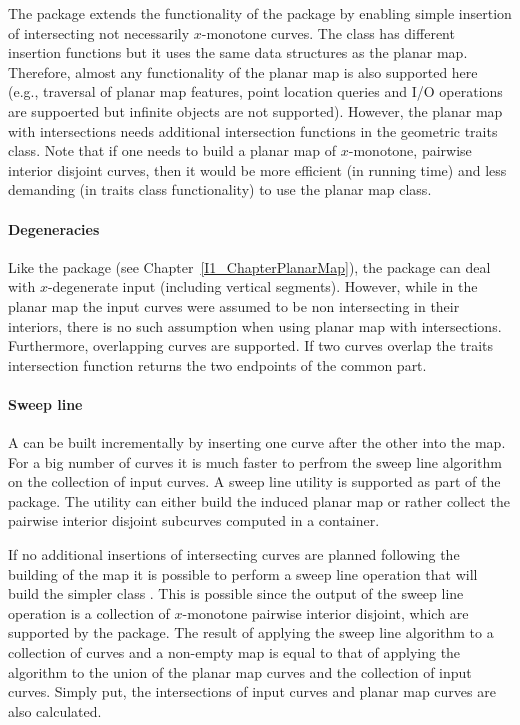   The  package extends the
  functionality of the  package by enabling simple
  insertion of intersecting not necessarily $x$-monotone curves. The
   class has different insertion
  functions but it uses the same data structures as the planar
  map. Therefore, almost any functionality of the planar map is also
  supported here (e.g., traversal of planar map features, point
  location queries and I/O operations are suppoerted but infinite
  objects are not supported). However, the planar map with
  intersections needs additional intersection functions in the
  geometric traits class. Note that if one needs to build a planar map
  of $x$-monotone, pairwise interior disjoint curves, then it would be
  more efficient (in running time) and less demanding (in traits class
  functionality) to use the planar map class.

\paragraph{Degeneracies} 
  Like the  package (see
  Chapter~\ref{I1_ChapterPlanarMap}), the  package can deal with $x$-degenerate input (including
  vertical segments). However, while in the planar map the input
  curves were assumed to be non intersecting in their interiors, there
  is no such assumption when using planar map with
  intersections. Furthermore, overlapping curves are supported. If two
  curves overlap the traits intersection function returns the two
  endpoints of the common part.

\paragraph{Sweep line}
  A  can be built incrementally by
  inserting one curve after the other into the map. For a big number
  of curves it is much faster to perfrom the sweep line algorithm on
  the collection of input curves. A sweep line utility is supported as
  part of the package. The utility can either build the induced planar
  map or rather collect the pairwise interior disjoint subcurves
  computed in a container. 

  If no additional insertions of intersecting curves are planned
  following the building of the map it is possible to perform a sweep
  line operation that will build the simpler class .
  This is possible since the output of the sweep line operation is a
  collection of $x$-monotone pairwise interior disjoint, which are
  supported by the  package. The result of applying
  the sweep line algorithm to a collection of curves and a non-empty
  map is equal to that of applying the algorithm to the union of the
  planar map curves and the collection of input curves. Simply put,
  the intersections of input curves and planar map curves are also
  calculated.

